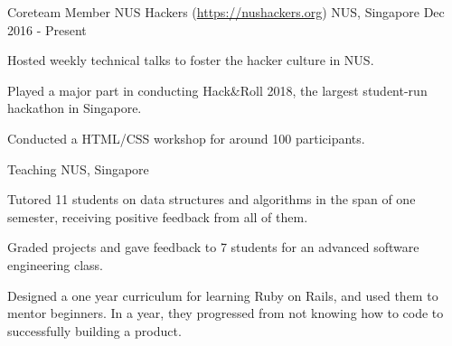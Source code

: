 

\begin{cventries}


  \cventry
  {Coreteam Member} %
  {NUS Hackers (\url{https://nushackers.org})} %
  {NUS, Singapore} %
  {Dec 2016 - Present} %
  { %
    \begin{cvitems}
    \item {Hosted weekly technical talks to foster the hacker culture in NUS.}
    \item {Played a major part in conducting Hack\&Roll 2018, the largest student-run hackathon in Singapore.}
    \item {Conducted a HTML/CSS workshop for around 100 participants.}
    \end{cvitems}
  }


  \cventry
  {} %
  {Teaching} %
  {NUS, Singapore} %
  {} %
  { %
    \begin{cvitems}
    \item {Tutored 11 students on data structures and algorithms in the span of one semester, receiving positive feedback from all of them.}
    \item {Graded projects and gave feedback to 7 students for an advanced software engineering class.}
    \item {Designed a one year curriculum for learning Ruby on Rails, and used them to mentor beginners. In a year, they progressed from not knowing how to code to successfully building a product.}
    \end{cvitems}
  }


\end{cventries}

